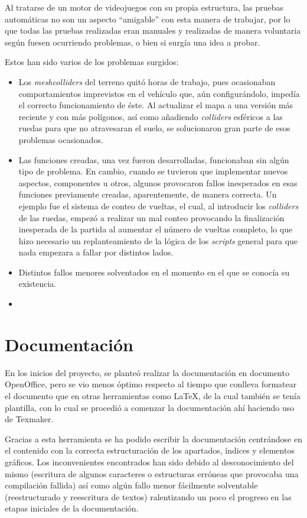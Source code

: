 Al tratarse de un motor de videojuegos con su propia estructura, las pruebas automáticas no son un aspecto ``amigable'' con esta manera de trabajar, por lo que todas las pruebas realizadas eran manuales y realizadas de manera voluntaria según fuesen ocurriendo problemas, o bien si surgía una idea a probar.

Estos han sido varios de los problemas surgidos:
\begin{itemize}
\tightlist
	\item Los \textit{meshcolliders} del terreno quitó horas de trabajo, pues ocasionaban comportamientos imprevistos en el vehículo que, aún configurándolo, impedía el correcto funcionamiento de éste. Al actualizar el mapa a una versión más reciente y con más polígonos, así como añadiendo \textit{colliders} esféricos a las ruedas para que no atravesaran el suelo, se solucionaron gran parte de esos problemas ocasionados.
	\item Las funciones creadas, una vez fueron desarrolladas, funcionaban sin algún tipo de problema. En cambio, cuando se tuvieron que implementar nuevos aspectos, componentes u otros, algunos provocaron fallos inesperados en esas funciones previamente creadas, aparentemente, de manera correcta. Un ejemplo fue el sistema de conteo de vueltas, el cual, al introducir los \textit{colliders} de las ruedas, empezó a realizar un mal conteo provocando la finalización inesperada de la partida al aumentar el número de vueltas completo, lo que hizo necesario un replanteamiento de la lógica de los \textit{scripts} general para que nada empezara a fallar por distintos lados.
	\item Distintos fallos menores solventados en el momento en el que se conocía su existencia.
	\item 
\end{itemize}

\section{Documentación}

En los inicios del proyecto, se planteó realizar la documentación en documento OpenOffice, pero se vio menos óptimo respecto al tiempo que conlleva formatear el documento que en otras herramientas como LaTeX, de la cual también se tenía plantilla, con lo cual se procedió a comenzar la documentación ahí haciendo uso de Texmaker.

Gracias a esta herramienta se ha podido escribir la documentación centrándose en el contenido con la correcta estructuración de los apartados, índices y elementos gráficos. Los inconvenientes encontrados han sido debido al desconocimiento del mismo (escritura de algunos caracteres o estructuras erróneas que provocaba una compilación fallida) así como algún fallo menor fácilmente solventable (reestructurado y reescritura de textos) ralentizando un poco el progreso en las etapas iniciales de la documentación.

